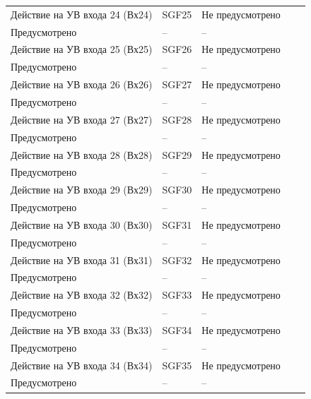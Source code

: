 \begin{longtable}{|>{\centering\arraybackslash}m{5.3cm}|>{\centering\arraybackslash}m{3.3cm}|>{\centering\arraybackslash}m{4.2cm}|>{\centering\arraybackslash}m{1.8cm}|>{\centering\arraybackslash}m{1cm}|}
\hline
\centering Действие на УВ входа 24 (Вх24)  & \centering SGF25 & \centering Не предусмотрено \\ Предусмотрено & \centering -- & \centering \arraybackslash -- \\
\hline
\centering Действие на УВ входа 25 (Вх25)  & \centering SGF26 & \centering Не предусмотрено \\ Предусмотрено & \centering -- & \centering \arraybackslash -- \\
\hline
\centering Действие на УВ входа 26 (Вх26)  & \centering SGF27 & \centering Не предусмотрено \\ Предусмотрено & \centering -- & \centering \arraybackslash -- \\
\hline
\centering Действие на УВ входа 27 (Вх27)  & \centering SGF28 & \centering Не предусмотрено \\ Предусмотрено & \centering -- & \centering \arraybackslash -- \\
\hline
\centering Действие на УВ входа 28 (Вх28)  & \centering SGF29 & \centering Не предусмотрено \\ Предусмотрено & \centering -- & \centering \arraybackslash -- \\
\hline
\centering Действие на УВ входа 29 (Вх29)  & \centering SGF30 & \centering Не предусмотрено \\ Предусмотрено & \centering -- & \centering \arraybackslash -- \\
\hline
\centering Действие на УВ входа 30 (Вх30)  & \centering SGF31 & \centering Не предусмотрено \\ Предусмотрено & \centering -- & \centering \arraybackslash -- \\
\hline
\centering Действие на УВ входа 31 (Вх31)  & \centering SGF32 & \centering Не предусмотрено \\ Предусмотрено & \centering -- & \centering \arraybackslash -- \\
\hline
\centering Действие на УВ входа 32 (Вх32)  & \centering SGF33 & \centering Не предусмотрено \\ Предусмотрено & \centering -- & \centering \arraybackslash -- \\
\hline
\centering Действие на УВ входа 33 (Вх33)  & \centering SGF34 & \centering Не предусмотрено \\ Предусмотрено & \centering -- & \centering \arraybackslash -- \\
\hline
\centering Действие на УВ входа 34 (Вх34)  & \centering SGF35 & \centering Не предусмотрено \\ Предусмотрено & \centering -- & \centering \arraybackslash -- \\

\end{longtable}
